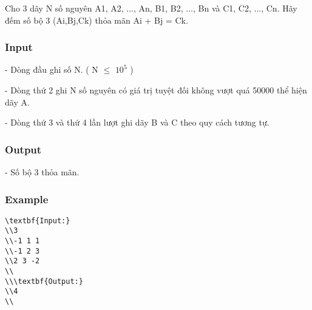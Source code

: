 



   Cho 3 dãy N số nguyên A1, A2, ..., An, B1, B2, ..., Bn và C1, C2, ..., Cn. Hãy đếm số bộ 3 (Ai,Bj,Ck) thỏa mãn Ai + Bj = Ck.  

\subsubsection{   Input  }

   - Dòng đầu ghi số N. ( N  $\le$  $10^{5}$   )  

   - Dòng thứ 2 ghi N số nguyên có giá trị tuyệt đối không vượt quá 50000 thể hiện dãy A.  

   - Dòng thứ 3 và thứ 4 lần lượt ghi dãy B và C theo quy cách tương tự.  

\subsubsection{   Output  }

   - Số bộ 3 thỏa mãn.  

\subsubsection{   Example  }
\begin{verbatim}
\textbf{Input:}
\\3
\\-1 1 1
\\-1 2 3
\\2 3 -2
\\
\\\textbf{Output:}
\\4
\\\end{verbatim}
